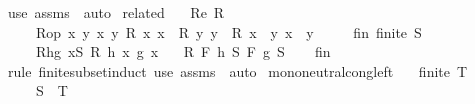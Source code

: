 \begin{isabellebody}
\ {\isacharparenleft}{\kern0pt}use\ assms\ \ auto{\isacharparenright}{\kern0pt}%
\endisatagproof
{\isafoldproof}%
%
\isadelimproof
\isanewline
%
\endisadelimproof
\isanewline
{}\isamarkupfalse%
\ related{\isacharcolon}{\kern0pt}\isanewline
\ \ \ Re{\isacharcolon}{\kern0pt}\ {\isachardoublequoteopen}R\ \ \isanewline
\ \ \ \ \ Rop{\isacharcolon}{\kern0pt}\ {\isachardoublequoteopen}{\isasymforall}x{}\ y{}\ x{}\ y{}{\isachardot}{\kern0pt}\ R\ x{}\ x{}\ {\isasymand}\ R\ y{}\ y{}\ {\isasymlongrightarrow}\ R\ {\isacharparenleft}{\kern0pt}x{}\ \isactrlbold {\isacharasterisk}{\kern0pt}\ y{}{\isacharparenright}{\kern0pt}\ {\isacharparenleft}{\kern0pt}x{}\ \isactrlbold {\isacharasterisk}{\kern0pt}\ y{}{\isacharparenright}{\kern0pt}{\isachardoublequoteclose}\isanewline
\ \ \ \ \ fin{\isacharcolon}{\kern0pt}\ {\isachardoublequoteopen}finite\ S{\isachardoublequoteclose}\isanewline
\ \ \ \ \ R{\isacharunderscore}{\kern0pt}h{\isacharunderscore}{\kern0pt}g{\isacharcolon}{\kern0pt}\ {\isachardoublequoteopen}{\isasymforall}x{\isasymin}S{\isachardot}{\kern0pt}\ R\ {\isacharparenleft}{\kern0pt}h\ x{\isacharparenright}{\kern0pt}\ {\isacharparenleft}{\kern0pt}g\ x{\isacharparenright}{\kern0pt}{\isachardoublequoteclose}\isanewline
\ \ \ {\isachardoublequoteopen}R\ {\isacharparenleft}{\kern0pt}F\ h\ S{\isacharparenright}{\kern0pt}\ {\isacharparenleft}{\kern0pt}F\ g\ S{\isacharparenright}{\kern0pt}{\isachardoublequoteclose}\isanewline
%
\isadelimproof
\ \ %
\endisadelimproof
%
\isatagproof
{}\isamarkupfalse%
\ fin\ \isamarkupfalse%
\ {\isacharparenleft}{\kern0pt}rule\ finite{\isacharunderscore}{\kern0pt}subset{\isacharunderscore}{\kern0pt}induct{\isacharparenright}{\kern0pt}\ {\isacharparenleft}{\kern0pt}use\ assms\ \ auto{\isacharparenright}{\kern0pt}%
\endisatagproof
{\isafoldproof}%
%
\isadelimproof
\isanewline
%
\endisadelimproof
\isanewline
{}\isamarkupfalse%
\ mono{\isacharunderscore}{\kern0pt}neutral{\isacharunderscore}{\kern0pt}cong{\isacharunderscore}{\kern0pt}left{\isacharcolon}{\kern0pt}\isanewline
\ \ \ {\isachardoublequoteopen}finite\ T{\isachardoublequoteclose}\isanewline
\ \ \ \ \ {\isachardoublequoteopen}S\ {\isasymsubseteq}\ T{\isachardoublequoteclose}\isanewline

\end{isabellebody}
